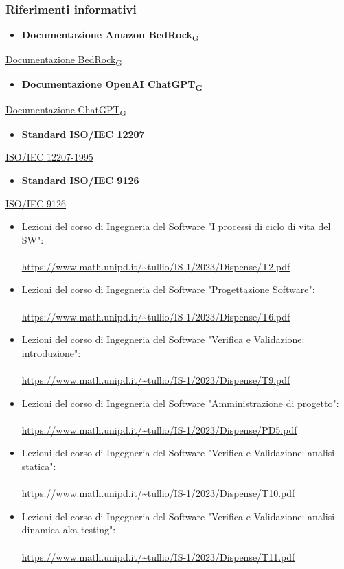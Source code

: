 \documentclass{article}
\begin{document}
\subsubsection{Riferimenti informativi}
\begin{itemize}
    \item \textbf{Documentazione Amazon BedRock}\textsubscript{G}
\end{itemize}
\href{https://docs.aws.amazon.com/bedrock/latest/userguide/what-is-bedrock.html}{Documentazione BedRock\textsubscript{G}}
\begin{itemize}
    \item \textbf{Documentazione OpenAI ChatGPT\textsubscript{G}}
\end{itemize}
\href{https://platform.openai.com/docs/introduction}{Documentazione ChatGPT\textsubscript{G}}
\begin{itemize}
    \item \textbf{Standard ISO/IEC 12207}
\end{itemize}
\href{https://www.math.unipd.it/~tullio/IS-1/2009/Approfondimenti/ISO_12207-1995.pdf}{ISO/IEC 12207-1995}
\begin{itemize}
    \item \textbf{Standard ISO/IEC 9126}
\end{itemize}
\href{http://www.colonese.it/00-Manuali_Pubblicatii/07-ISO-IEC9126_v2.pdf}{ISO/IEC 9126}
\begin{itemize}
\item Lezioni del corso di Ingegneria del Software "I processi di ciclo di vita del SW": \\ \\
\url{https://www.math.unipd.it/~tullio/IS-1/2023/Dispense/T2.pdf} 
\item Lezioni del corso di Ingegneria del Software "Progettazione Software": \\ \\ 
\url{https://www.math.unipd.it/~tullio/IS-1/2023/Dispense/T6.pdf}
\item Lezioni del corso di Ingegneria del Software "Verifica e Validazione: introduzione": \\ \\
\url{https://www.math.unipd.it/~tullio/IS-1/2023/Dispense/T9.pdf}
\item Lezioni del corso di Ingegneria del Software "Amministrazione di progetto": \\ \\
\url{https://www.math.unipd.it/~tullio/IS-1/2023/Dispense/PD5.pdf}
\item Lezioni del corso di Ingegneria del Software "Verifica e Validazione: analisi statica":\\ \\
\url{https://www.math.unipd.it/~tullio/IS-1/2023/Dispense/T10.pdf}
\item Lezioni del corso di Ingegneria del Software "Verifica e Validazione: analisi dinamica aka testing": \\ \\
\url{https://www.math.unipd.it/~tullio/IS-1/2023/Dispense/T11.pdf}
\end{itemize}
\end{document}
